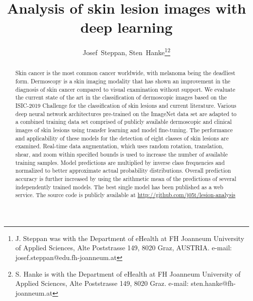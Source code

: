 \documentclass[journal]{IEEEtran}
\begin{document}
\title{Analysis of skin lesion images with deep learning}


\author{Josef~Steppan,
        Sten~Hanke\thanks{J. Steppan was with the Department
of eHealth at FH Joanneum University of Applied Sciences, Alte Poststrasse 149, 8020 Graz, AUSTRIA. e-mail: josef.steppan@edu.fh-joanneum.at}\thanks{S. Hanke is with the Department
of eHealth at FH Joanneum University of Applied Sciences, Alte Poststrasse 149, 8020 Graz. e-mail: sten.hanke@fh-joanneum.at}}





















\maketitle

\begin{abstract}
Skin cancer is the most common cancer worldwide, with melanoma being the deadliest form. Dermoscopy is a skin imaging modality that has shown an improvement in the diagnosis of skin cancer compared to visual examination without support. We evaluate the current state of the art in the classification of dermoscopic images based on the ISIC-2019 Challenge for the classification of skin lesions and current literature. Various deep neural network architectures pre-trained on the ImageNet data set are adapted to a combined training data set comprised of publicly available dermoscopic and clinical images of skin lesions using transfer learning and model fine-tuning. The performance and applicability of these models for the detection of eight classes of skin lesions are examined. Real-time data augmentation, which uses random rotation, translation, shear, and zoom within specified bounds is used to increase the number of available training samples. Model predictions are multiplied by inverse class frequencies and normalized to better approximate actual probability distributions. Overall prediction accuracy is further increased by using the arithmetic mean of the predictions of several independently trained models. The best single model has been published as a web service. The source code is publicly available at \url{http://github.com/j05t/lesion-analysis}
\end{abstract}
\end{document}
